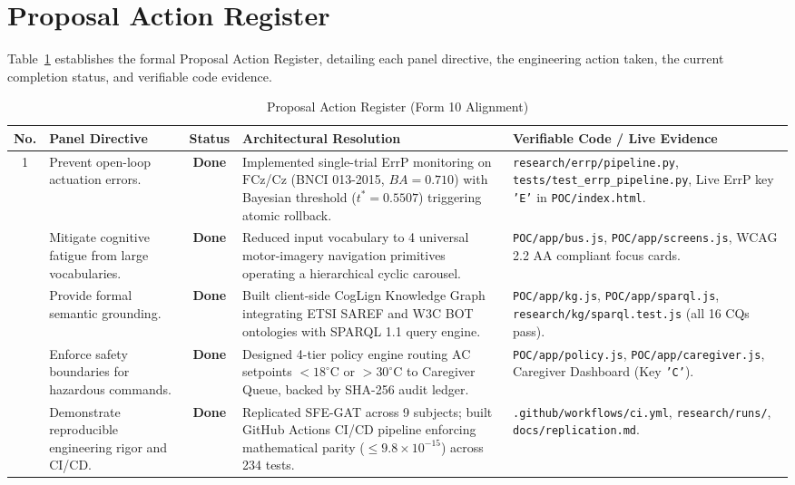 \documentclass[12pt,a4paper]{report}
\begin{document}
\section{Proposal Action Register}
Table~\ref{tab:panel_actions} establishes the formal Proposal Action Register, detailing each panel directive, the engineering action taken, the current completion status, and verifiable code evidence.

\begin{table}[H]
\centering
\small
\caption{Proposal Action Register (Form 10 Alignment)}
\label{tab:panel_actions}
\begin{tabularx}{\textwidth}{c p{3.5cm} c p{4.2cm} X}
\toprule
\textbf{No.} & \textbf{Panel Directive} & \textbf{Status} & \textbf{Architectural Resolution} & \textbf{Verifiable Code / Live Evidence} \\
\midrule
1 & Prevent open-loop actuation errors. & \textbf{Done} & Implemented single-trial ErrP monitoring on $\mathrm{FCz}$/$\mathrm{Cz}$ (BNCI 013-2015, $BA = 0.710$) with Bayesian threshold ($t^* = 0.5507$) triggering atomic rollback. & \texttt{research/errp/pipeline.py}, \texttt{tests/test\_errp\_pipeline.py}, Live ErrP key \texttt{'E'} in \texttt{POC/index.html}. \\
\addlinespace
2 & Mitigate cognitive fatigue from large vocabularies. & \textbf{Done} & Reduced input vocabulary to 4 universal motor-imagery navigation primitives operating a hierarchical cyclic carousel. & \texttt{POC/app/bus.js}, \texttt{POC/app/screens.js}, WCAG 2.2 AA compliant focus cards. \\
\addlinespace
3 & Provide formal semantic grounding. & \textbf{Done} & Built client-side CogLign Knowledge Graph integrating ETSI SAREF and W3C BOT ontologies with SPARQL 1.1 query engine. & \texttt{POC/app/kg.js}, \texttt{POC/app/sparql.js}, \texttt{research/kg/sparql.test.js} (all 16 CQs pass). \\
\addlinespace
4 & Enforce safety boundaries for hazardous commands. & \textbf{Done} & Designed 4-tier policy engine routing AC setpoints $< 18^\circ\text{C}$ or $> 30^\circ\text{C}$ to Caregiver Queue, backed by SHA-256 audit ledger. & \texttt{POC/app/policy.js}, \texttt{POC/app/caregiver.js}, Caregiver Dashboard (Key \texttt{'C'}). \\
\addlinespace
5 & Demonstrate reproducible engineering rigor and CI/CD. & \textbf{Done} & Replicated SFE-GAT across 9 subjects; built GitHub Actions CI/CD pipeline enforcing mathematical parity ($\le 9.8 \times 10^{-15}$) across 234 tests. & \texttt{.github/workflows/ci.yml}, \texttt{research/runs/}, \texttt{docs/replication.md}. \\
\bottomrule
\end{tabularx}
\end{table}
\end{document}
